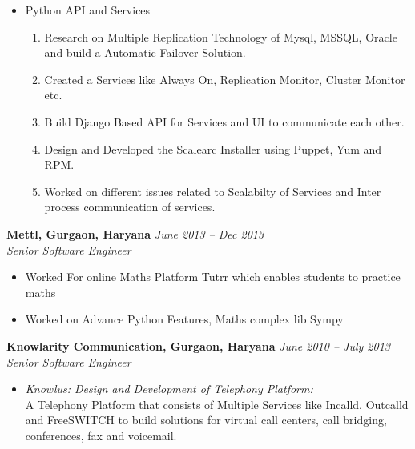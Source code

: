 \documentclass[margin,line]{resume}
\begin{document}
\begin{resume}
\begin{itemize}
    \item Python API and Services
    \begin{enumerate}
    \item Research on Multiple Replication Technology of Mysql, MSSQL, Oracle and build a Automatic Failover Solution.  
    \item Created a Services like Always On, Replication Monitor, Cluster Monitor etc.
    \item Build Django Based API for Services and UI to communicate each other.
    \item Design and Developed the Scalearc Installer using Puppet, Yum and RPM.
    \item Worked on different issues related to Scalabilty of Services and Inter process communication of services.
    \end{enumerate}
    \end{itemize}
      
    \textbf{Mettl, Gurgaon, Haryana }\hfill \textsl{June 2013 -- Dec 2013}\vspace{0mm}\\\vspace{0mm}%
    \textsl{Senior Software Engineer}   
    \begin{itemize}
    \item Worked For online Maths Platform Tutrr which enables students to practice maths
    \item Worked on Advance Python Features, Maths complex lib Sympy
    \end{itemize}
    
    \textbf{Knowlarity Communication, Gurgaon, Haryana}   \hfill \textsl{June 2010 -- July 2013} \vspace{0mm}\\\vspace{0mm}%
           \textsl{Senior Software Engineer} 
    \begin{itemize}
     \item \textsl{Knowlus: Design and Development of Telephony Platform:} \\
       A Telephony Platform that consists of Multiple Services like Incalld, Outcalld and FreeSWITCH to build solutions for virtual call centers, call bridging, conferences, fax and voicemail.
      

\end{itemize}
\end{resume}
\end{document}
